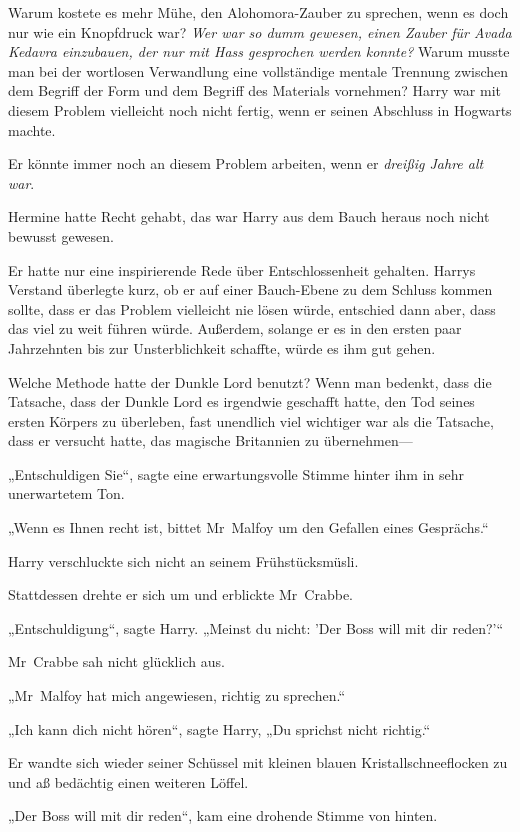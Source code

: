 {Warum kostete es mehr Mühe, den Alohomora-Zauber zu sprechen, wenn es doch nur wie ein Knopfdruck war? \emph{Wer war so dumm gewesen, einen Zauber für Avada Kedavra einzubauen, der nur mit Hass gesprochen werden konnte?} Warum musste man bei der wortlosen Verwandlung eine vollständige mentale Trennung zwischen dem Begriff der Form und dem Begriff des Materials vornehmen? Harry war mit diesem Problem vielleicht noch nicht fertig, wenn er seinen Abschluss in Hogwarts machte.

Er könnte immer noch an diesem Problem arbeiten, wenn er \emph{dreißig Jahre alt war}.

Hermine hatte Recht gehabt, das war Harry aus dem Bauch heraus noch nicht bewusst gewesen.

Er hatte nur eine inspirierende Rede über Entschlossenheit gehalten. Harrys Verstand überlegte kurz, ob er auf einer Bauch-Ebene zu dem Schluss kommen sollte, dass er das Problem vielleicht nie lösen würde, entschied dann aber, dass das viel zu weit führen würde. Außerdem, solange er es in den ersten paar Jahrzehnten bis zur Unsterblichkeit schaffte, würde es ihm gut gehen.

Welche Methode hatte der Dunkle Lord benutzt? Wenn man bedenkt, dass die Tatsache, dass der Dunkle Lord es irgendwie geschafft hatte, den Tod seines ersten Körpers zu überleben, fast unendlich viel wichtiger war als die Tatsache, dass er versucht hatte, das magische Britannien zu übernehmen—

„Entschuldigen Sie“, sagte eine erwartungsvolle Stimme hinter ihm in sehr unerwartetem Ton.

„Wenn es Ihnen recht ist, bittet Mr~Malfoy um den Gefallen eines Gesprächs.“

Harry verschluckte sich nicht an seinem Frühstücksmüsli.

Stattdessen drehte er sich um und erblickte Mr~Crabbe.

„Entschuldigung“, sagte Harry. „Meinst du nicht: 'Der Boss will mit dir reden?'“

Mr~Crabbe sah nicht glücklich aus.

„Mr~Malfoy hat mich angewiesen, richtig zu sprechen.“

„Ich kann dich nicht hören“, sagte Harry, „Du sprichst nicht richtig.“

Er wandte sich wieder seiner Schüssel mit kleinen blauen Kristallschneeflocken zu und aß bedächtig einen weiteren Löffel.

„Der Boss will mit dir reden“, kam eine drohende Stimme von hinten.

}
